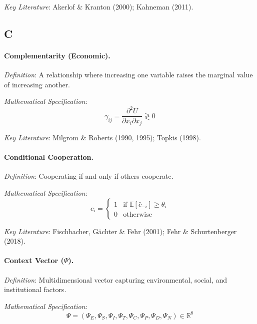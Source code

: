 \textit{Key Literature}: Akerlof \& Kranton (2000); Kahneman (2011).

\subsection*{C}

\paragraph{Complementarity (Economic).}
\textit{Definition}: A relationship where increasing one variable raises the 
marginal value of increasing another.

\textit{Mathematical Specification}:
\begin{equation}
\gamma_{ij} = \frac{\partial^2 U}{\partial x_i \partial x_j} \gtrless 0
\end{equation}

\textit{Key Literature}: Milgrom \& Roberts (1990, 1995); Topkis (1998).

\medskip

\paragraph{Conditional Cooperation.}
\textit{Definition}: Cooperating if and only if others cooperate.

\textit{Mathematical Specification}:
\begin{equation}
c_i = \begin{cases} 1 & \text{if } \mathbb{E}[\bar{c}_{-i}] \geq \theta_i \\ 0 & \text{otherwise} \end{cases}
\end{equation}

\textit{Key Literature}: Fischbacher, Gächter \& Fehr (2001); Fehr \& Schurtenberger (2018).

\medskip

\paragraph{Context Vector ($\Psi$).}
\textit{Definition}: Multidimensional vector capturing environmental, social, 
and institutional factors.

\textit{Mathematical Specification}:
\begin{equation}
\Psi = (\Psi_E, \Psi_S, \Psi_I, \Psi_T, \Psi_C, \Psi_P, \Psi_D, \Psi_N) \in \mathbb{R}^8
\end{equation}

